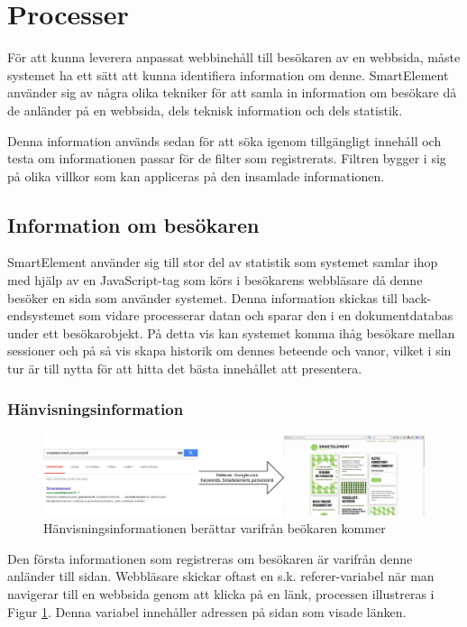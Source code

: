 \section{Processer}

För att kunna leverera anpassat webbinehåll till besökaren av en webbsida, måste systemet ha ett sätt att kunna identifiera information om denne. SmartElement använder sig av några olika tekniker för att samla in information om besökare då de anländer på en webbsida, dels teknisk information och dels statistik.

Denna information används sedan för att söka igenom tillgängligt innehåll och testa om informationen passar för de filter som registrerats. Filtren bygger i sig på olika villkor som kan appliceras på den insamlade informationen.

\subsection{Information om besökaren}

SmartElement använder sig till stor del av statistik som systemet samlar ihop med hjälp av en JavaScript-tag som körs i besökarens webbläsare då denne besöker en sida som använder systemet. Denna information skickas till back-endsystemet som vidare processerar datan och sparar den i en dokumentdatabas under ett besökarobjekt. På detta vis kan systemet komma ihåg besökare mellan sessioner och på så vis skapa historik om dennes beteende och vanor, vilket i sin tur är till nytta för att hitta det bästa innehållet att presentera.

\subsubsection{Hänvisningsinformation}

\begin{figure}[h!]
\centering
\includegraphics[width=150mm]{assets/images/smelereferer.png}
\caption{Hänvisningsinformationen berättar varifrån beökaren kommer}
\label{referer}
\end{figure}

Den första informationen som registreras om besökaren är varifrån denne anländer till sidan. Webbläsare skickar oftast en s.k. referer-variabel när man navigerar till en webbsida genom att klicka på en länk, processen illustreras i Figur \ref{referer}. Denna variabel innehåller adressen på sidan som visade länken.

